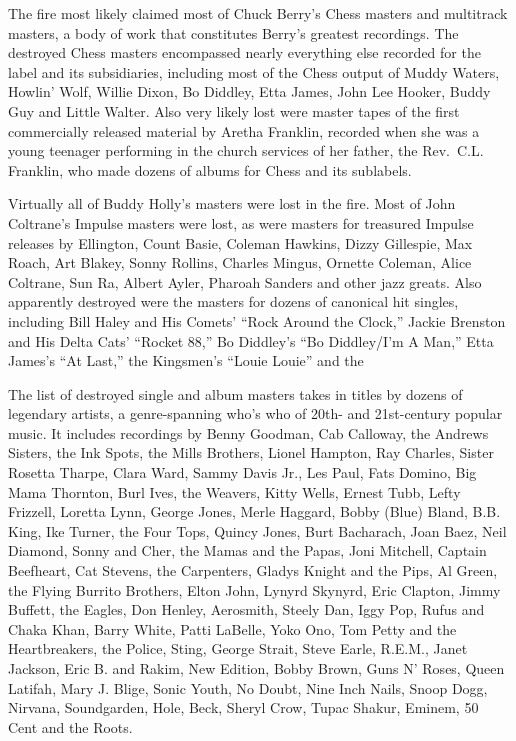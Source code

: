 \documentclass[11pt]{article}
\begin{document}
\begin{multicols}{2}
{\begin{leftbar}
  The fire most likely claimed most of Chuck Berry's Chess masters and
  multitrack masters, a body of work that constitutes Berry's greatest
  recordings. The destroyed Chess masters encompassed nearly everything
  else recorded for the label and its subsidiaries, including most of
  the Chess output of Muddy Waters, Howlin' Wolf, Willie Dixon, Bo
  Diddley, Etta James, John Lee Hooker, Buddy Guy and Little Walter.
  Also very likely lost were master tapes of the first commercially
  released material by Aretha Franklin, recorded when she was a young
  teenager performing in the church services of her father, the
  Rev.~C.L. Franklin, who made dozens of albums for Chess and its
  sublabels.

  Virtually all of Buddy Holly's masters were lost in the fire. Most of
  John Coltrane's Impulse masters were lost, as were masters for
  treasured Impulse releases by Ellington, Count Basie, Coleman Hawkins,
  Dizzy Gillespie, Max Roach, Art Blakey, Sonny Rollins, Charles Mingus,
  Ornette Coleman, Alice Coltrane, Sun Ra, Albert Ayler, Pharoah Sanders
  and other jazz greats. Also apparently destroyed were the masters for
  dozens of canonical hit singles, including Bill Haley and His Comets'
  ``Rock Around the Clock,'' Jackie Brenston and His Delta Cats'
  ``Rocket 88,'' Bo Diddley's ``Bo Diddley/I'm A Man,'' Etta James's
  ``At Last,'' the Kingsmen's ``Louie Louie'' and the

  The list of destroyed single and album masters takes in titles by
  dozens of legendary artists, a genre-spanning who's who of 20th- and
  21st-century popular music. It includes recordings by Benny Goodman,
  Cab Calloway, the Andrews Sisters, the Ink Spots, the Mills Brothers,
  Lionel Hampton, Ray Charles, Sister Rosetta Tharpe, Clara Ward, Sammy
  Davis Jr., Les Paul, Fats Domino, Big Mama Thornton, Burl Ives, the
  Weavers, Kitty Wells, Ernest Tubb, Lefty Frizzell, Loretta Lynn,
  George Jones, Merle Haggard, Bobby (Blue) Bland, B.B. King, Ike
  Turner, the Four Tops, Quincy Jones, Burt Bacharach, Joan Baez, Neil
  Diamond, Sonny and Cher, the Mamas and the Papas, Joni Mitchell,
  Captain Beefheart, Cat Stevens, the Carpenters, Gladys Knight and the
  Pips, Al Green, the Flying Burrito Brothers, Elton John, Lynyrd
  Skynyrd, Eric Clapton, Jimmy Buffett, the Eagles, Don Henley,
  Aerosmith, Steely Dan, Iggy Pop, Rufus and Chaka Khan, Barry White,
  Patti LaBelle, Yoko Ono, Tom Petty and the Heartbreakers, the Police,
  Sting, George Strait, Steve Earle, R.E.M., Janet Jackson, Eric B. and
  Rakim, New Edition, Bobby Brown, Guns N' Roses, Queen Latifah, Mary J.
  Blige, Sonic Youth, No Doubt, Nine Inch Nails, Snoop Dogg, Nirvana,
  Soundgarden, Hole, Beck, Sheryl Crow, Tupac Shakur, Eminem, 50 Cent
  and the Roots.


\end{leftbar}}
\end{multicols}
\end{document}
